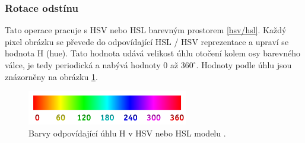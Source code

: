 \documentclass[11pt, a4paper, titlepage]{article}
\begin{document}
\subsubsection{Rotace odstínu}
Tato operace pracuje s HSV nebo HSL barevným prostorem \ref{hsv/hsl}.
Každý pixel obrázku se převede do odpovídající HSL / HSV reprezentace a upraví se hodnota H (hue).
Tato hodnota udává velikost úhlu otočení kolem osy barevného válce, je tedy periodická a nabývá hodnoty 0 až $360^\circ$.
Hodnoty podle úhlu jsou znázorněny na obrázku \ref{fig:huerotate-scale}.
\begin{figure}[h]
    \centering
    \includegraphics[width=7cm]{hue_scale.png}
    \caption{Barvy odpovídající úhlu H v HSV nebo HSL modelu \cite{wiki:Hue}.}
    \label{fig:huerotate-scale}
\end{figure}
\end{document}

